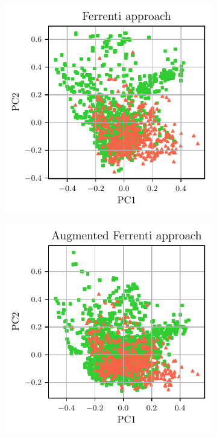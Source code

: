\documentclass[superscriptaddress,unsortedaddress,
 amsmath,amssymb,
 aps,
]{revtex4-2}
\begin{document}
\begin{figure}[h] %
    \centering
    \begin{subfigure}{0.3\textwidth}
        \centering
        \includegraphics[width=1\textwidth]{figures/pca-2d-plots/01-ferrenti-approach-v2.pdf}
    \end{subfigure}%
    \begin{subfigure}{0.3\textwidth}
        \centering
        \includegraphics[width=1\textwidth]{figures/pca-2d-plots/02-augmented-ferrenti-approach.pdf}

\end{subfigure}
\end{figure}
\end{document}
